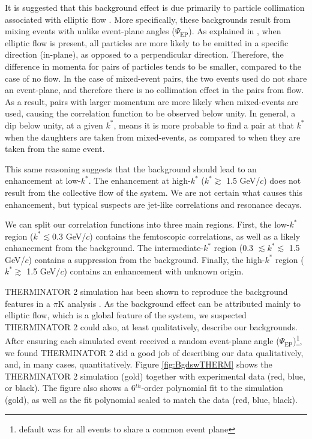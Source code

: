 \documentclass[/home/jesse/Analysis/FemtoAnalysis/AnalysisNotes/AnalysisNoteJBuxton.tex]{subfiles}
\begin{document}
It is suggested that this background effect is due primarily to particle collimation associated with elliptic flow \cite{Kisiel:2017}.  
More specifically, these backgrounds result from mixing events with unlike event-plane angles ($\Psi_{\textrm{EP}}$).  
As explained in \cite{Kisiel:2017}, when elliptic flow is present, all particles are more likely to be emitted in a specific direction (in-plane), as opposed to a perpendicular direction.  
Therefore, the difference in momenta for pairs of particles tends to be smaller, compared to the case of no flow.  
In the case of mixed-event pairs, the two events used do not share an event-plane, and therefore there is no collimation effect in the pairs from flow.  
As a result, pairs with larger momentum are more likely when mixed-events are used, causing the correlation function to be observed below unity.  
In general, a dip below unity, at a given $k^{*}$, means it is more probable to find a pair at that $k^{*}$ when the daughters are taken from mixed-events, as compared to when they are taken from the same event.

This same reasoning suggests that the background should lead to an enhancement at low-$k^{*}$.  
The enhancement at high-$k^{*}$ ($k^{*} \gtrsim$ 1.5 GeV/$c$) does not result from the collective flow of the system.  
We are not certain what causes this enhancement, but typical suspects are jet-like correlations and resonance decays.

We can split our correlation functions into three main regions.  
First, the low-$k^{*}$ region ($k^{*} \lesssim 0.3$ GeV/$c$) contains the femtoscopic correlations, as well as a likely enhancement from the background.  
The intermediate-$k^{*}$ region (0.3 $\lesssim k^{*} \lesssim$ 1.5 GeV/$c$) contains a suppression from the background.  
Finally, the high-$k^{*}$ region ($k^{*} \gtrsim$ 1.5 GeV/$c$) contains an enhancement with unknown origin.

THERMINATOR 2 simulation has been shown to reproduce the background features in a $\pi$K analysis \cite{Kisiel:2017}.  
As the background effect can be attributed mainly to elliptic flow, which is a global feature of the system, we suspected THERMINATOR 2 could also, at least qualitatively, describe our backgrounds.  
After ensuring each simulated event received a random event-plane angle ($\Psi_{\mathrm{EP}}$)\footnote{default was for all events to share a common event plane}, we found THERMINATOR 2 did a good job of describing our data qualitatively, and, in many cases, quantitatively.  
Figure \ref{fig:BgdswTHERM} shows the THERMINATOR 2 simulation (gold) together with experimental data (red, blue, or black).  
The figure also shows a 6$^{th}$-order polynomial fit to the simulation (gold), as well as the fit polynomial scaled to match the data (red, blue, black).  
\end{document}
